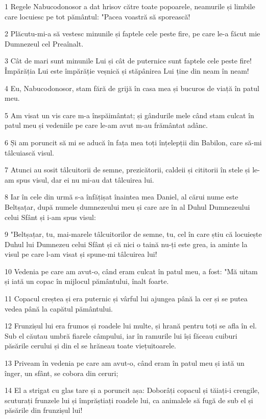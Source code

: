 \par 1 Regele Nabucodonosor a dat hrisov către toate popoarele, neamurile și limbile care locuiesc pe tot pământul: "Pacea voastră să sporească!
\par 2 Plăcutu-mi-a să vestesc minunile și faptele cele peste fire, pe care le-a făcut mie Dumnezeul cel Preaînalt.
\par 3 Cât de mari sunt minunile Lui și cât de puternice sunt faptele cele peste fire! Împărăția Lui este împărăție veșnică și stăpânirea Lui ține din neam în neam!
\par 4 Eu, Nabucodonosor, stam fără de grijă în casa mea și bucuros de viață în patul meu.
\par 5 Am visat un vis care m-a înspăimântat; și gândurile mele când stam culcat în patul meu și vedeniile pe care le-am avut m-au frământat adânc.
\par 6 Și am poruncit să mi se aducă în fața mea toți înțelepții din Babilon, care să-mi tâlcuiască visul.
\par 7 Atunci au sosit tâlcuitorii de semne, prezicătorii, caldeii și cititorii în stele și le-am spus visul, dar ei nu mi-au dat tâlcuirea lui.
\par 8 Iar în cele din urmă s-a înfățișat înaintea mea Daniel, al cărui nume este Beltșațar, după numele dumnezeului meu și care are în al Duhul Dumnezeului celui Sfânt și i-am spus visul:
\par 9 "Beltșațar, tu, mai-marele tâlcuitorilor de semne, tu, cel în care știu că locuiește Duhul lui Dumnezeu celui Sfânt și că nici o taină nu-ți este grea, ia aminte la visul pe care l-am visat și spune-mi tâlcuirea lui!
\par 10 Vedenia pe care am avut-o, când eram culcat în patul meu, a fost: "Mă uitam și iată un copac în mijlocul pământului, înalt foarte.
\par 11 Copacul creștea și era puternic și vârful lui ajungea până la cer și se putea vedea până la capătul pământului.
\par 12 Frunzișul lui era frumos și roadele lui multe, și hrană pentru toți se afla în el. Sub el căutau umbră fiarele câmpului, iar în ramurile lui își făceau cuiburi păsările cerului și din el se hrăneau toate viețuitoarele.
\par 13 Priveam în vedenia pe care am avut-o, când eram în patul meu și iată un înger, un sfânt, se cobora din ceruri;
\par 14 El a strigat cu glas tare și a poruncit așa: Doborâți copacul și tăiați-i crengile, scuturați frunzele lui și împrăștiați roadele lui, ca animalele să fugă de sub el și păsările din frunzișul lui!
